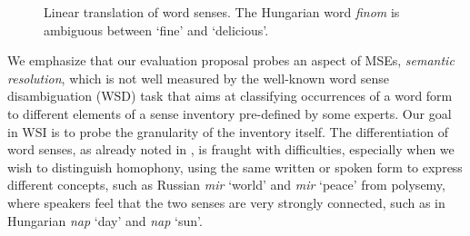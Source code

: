 \documentclass[11pt]{article}
\begin{document}
\begin{figure}[b]
    \centering
    \resizebox{\columnwidth}{!} {
    }
    \caption{Linear translation of word senses. The Hungarian word
        \emph{finom} is ambiguous between `fine' and `delicious'.}
        \label{fig:AdaGram}
\end{figure}

We emphasize that our evaluation proposal probes an aspect of MSEs,
\emph{semantic resolution}, which is not well measured by the well-known word
sense disambiguation (WSD) task that aims at classifying occurrences of a word
form to different elements of a sense inventory pre-defined by some experts.
Our goal in WSI is to probe the granularity of the inventory itself.  The
differentiation of word senses, as already noted in \cite{Borbely:2016}, is
fraught with difficulties, especially when we wish to distinguish homophony,
using the same written or spoken form to express different concepts, such as
Russian {\it mir} `world' and {\it mir} `peace' from polysemy, where speakers
feel that the two senses are very strongly connected, such as in Hungarian {\it
nap} `day' and {\it nap} `sun'.  

\end{document}
